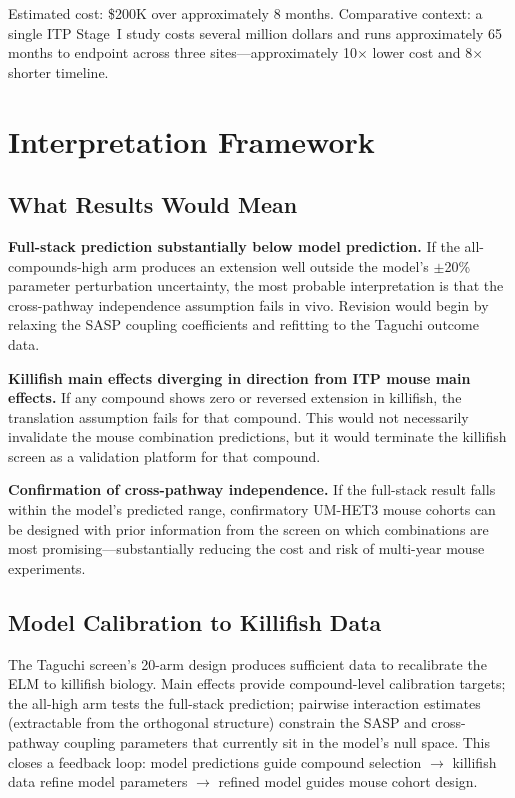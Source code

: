\documentclass[11pt]{article}
\begin{document}
Estimated cost: \$200K over approximately 8 months. Comparative context: a single ITP Stage~I study costs several million dollars and runs approximately 65 months to endpoint across three sites---approximately 10$\times$ lower cost and 8$\times$ shorter timeline.

\section{Interpretation Framework}

\subsection{What Results Would Mean}

\textbf{Full-stack prediction substantially below model prediction.} If the all-compounds-high arm produces an extension well outside the model's $\pm$20\% parameter perturbation uncertainty, the most probable interpretation is that the cross-pathway independence assumption fails in vivo. Revision would begin by relaxing the SASP coupling coefficients and refitting to the Taguchi outcome data.

\textbf{Killifish main effects diverging in direction from ITP mouse main effects.} If any compound shows zero or reversed extension in killifish, the translation assumption fails for that compound. This would not necessarily invalidate the mouse combination predictions, but it would terminate the killifish screen as a validation platform for that compound.

\textbf{Confirmation of cross-pathway independence.} If the full-stack result falls within the model's predicted range, confirmatory UM-HET3 mouse cohorts can be designed with prior information from the screen on which combinations are most promising---substantially reducing the cost and risk of multi-year mouse experiments.

\subsection{Model Calibration to Killifish Data}

The Taguchi screen's 20-arm design produces sufficient data to recalibrate the ELM to killifish biology. Main effects provide compound-level calibration targets; the all-high arm tests the full-stack prediction; pairwise interaction estimates (extractable from the orthogonal structure) constrain the SASP and cross-pathway coupling parameters that currently sit in the model's null space. This closes a feedback loop: model predictions guide compound selection $\to$ killifish data refine model parameters $\to$ refined model guides mouse cohort design.
\end{document}
